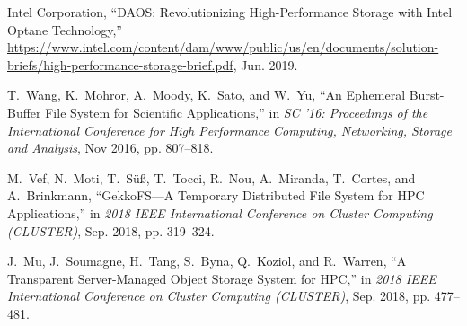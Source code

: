 \documentclass[11pt]{article}
\begin{document}
\begin{thebibliography}{10}
\begin{small}
{Intel Corporation}, ``{DAOS: Revolutionizing High-Performance Storage with
  Intel Optane Technology},''
  \url{https://www.intel.com/content/dam/www/public/us/en/documents/solution-briefs/high-performance-storage-brief.pdf},
  Jun. 2019.

T.~{Wang}, K.~{Mohror}, A.~{Moody}, K.~{Sato}, and W.~{Yu}, ``{An Ephemeral
  Burst-Buffer File System for Scientific Applications},'' in \emph{SC '16:
  Proceedings of the International Conference for High Performance Computing,
  Networking, Storage and Analysis}, Nov 2016, pp. 807--818.

M.~{Vef}, N.~{Moti}, T.~{Süß}, T.~{Tocci}, R.~{Nou}, A.~{Miranda},
  T.~{Cortes}, and A.~{Brinkmann}, ``{GekkoFS---A Temporary Distributed File
  System for HPC Applications},'' in \emph{2018 IEEE International Conference
  on Cluster Computing (CLUSTER)}, Sep. 2018, pp. 319--324.

J.~{Mu}, J.~{Soumagne}, H.~{Tang}, S.~{Byna}, Q.~{Koziol}, and R.~{Warren},
  ``{A Transparent Server-Managed Object Storage System for HPC},'' in
  \emph{2018 IEEE International Conference on Cluster Computing (CLUSTER)},
  Sep. 2018, pp. 477--481.

\end{small}
\end{thebibliography}
\end{document}
